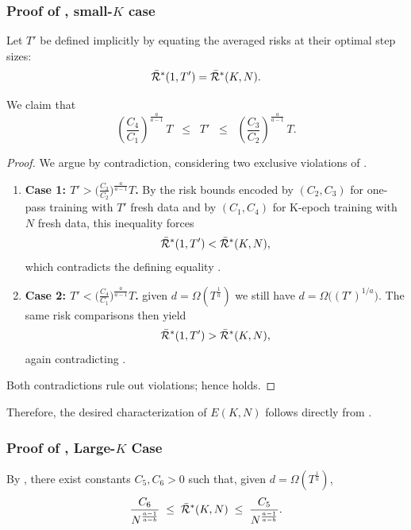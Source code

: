 \subsubsection{Proof of , small-$K$ case}
 Let $T'$ be defined implicitly by equating the averaged risks at their optimal step sizes:
\begin{equation}\label{eq:equal-risk}
\Bar{\mathcal{R}}^*(1, T')=\Bar{\mathcal{R}}^*(K, N).
\end{equation}

We claim that 
\begin{equation} \label{eq:Tprime-band}
\left(\frac{C_4}{C_1}\right)^{\!\frac{a}{a-1}} \, T
\;\;\le\;\;
T'
\;\;\le\;\;
\left(\frac{C_3}{C_2}\right)^{\!\frac{a}{a-1}} \, T.
\end{equation}

\begin{proof}
We argue by contradiction, considering two exclusive violations of .

\begin{enumerate}
\item \textbf{Case 1: $T' > \bigl(\tfrac{C_3}{C_2}\bigr)^{\frac{a}{a-1}} T$.}
By the risk bounds encoded by $(C_2,C_3)$ for one-pass training with $T'$ fresh data and by $(C_1,C_4)$ for K-epoch training with $N$ fresh data, this inequality forces
\[
\Bar{\mathcal{R}}^*(1, T')<\Bar{\mathcal{R}}^*(K, N),
\]
which contradicts the defining equality .

\item \textbf{Case 2: $T' < \bigl(\tfrac{C_4}{C_1}\bigr)^{\frac{a}{a-1}} T$.}
given $d =\Omega(T^{\frac{1}{a}})$ we still have $d=\Omega\!\bigl((T')^{1/a}\bigr)$.
The same risk comparisons then yield
\[
\Bar{\mathcal{R}}^*(1, T')>\Bar{\mathcal{R}}^*(K, N),
\]
again contradicting .
\end{enumerate}
Both contradictions rule out violations; hence  holds. 
\end{proof}

Therefore, the desired characterization of $E(K,N)$ follows directly from .

\subsubsection{Proof of , Large-$K$ Case}
By , there exist constants $C_5,C_6>0$ such that, given $d = \Omega(T^{\frac{1}{a}})$,
\begin{equation}\label{eq:largeK-two-sided}
\frac{C_6}{N^{\frac{a-1}{a-b}}}
\;\le\;
\Bar{\mathcal{R}}^*(K,N)
\;\le\;
\frac{C_5}{N^{\frac{a-1}{a-b}}}.
\end{equation}

